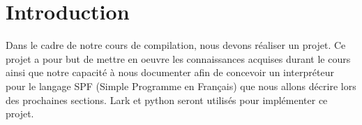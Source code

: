 \section{Introduction}
Dans le cadre de notre cours de compilation, nous devons réaliser un projet.
Ce projet a pour but de mettre en oeuvre les connaissances acquises durant le cours ainsi que notre capacité à nous documenter afin de concevoir un interpréteur pour le langage SPF (Simple Programme en Français) que nous allons décrire lors des prochaines sections. 
Lark et python seront utilisés pour implémenter ce projet.
